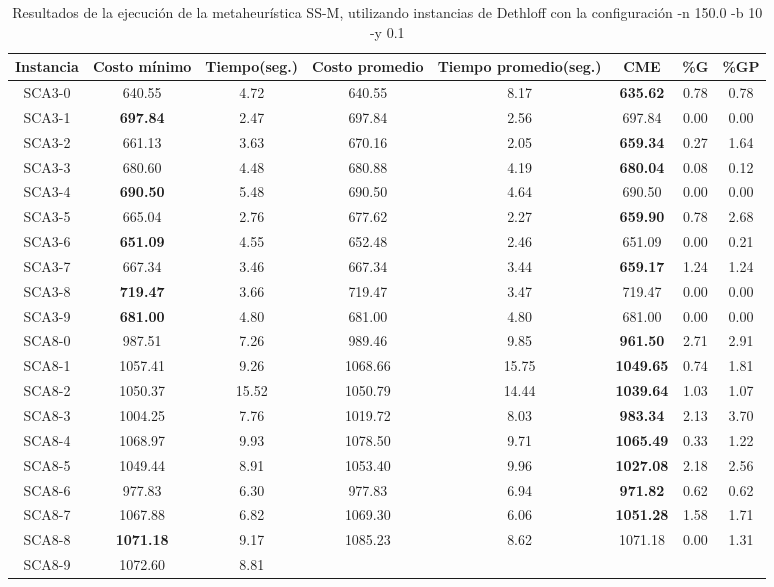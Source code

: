 \begin{table}[h]
\caption{Resultados de la ejecución de la metaheurística SS-M, utilizando instancias de Dethloff con la configuración -n 150.0 -b 10 -y 0.1}
\centering
\small
\begin{tabular}{c c c c c c c c}
\hline\hline
Instancia & Costo mínimo & Tiempo(seg.) & Costo promedio & Tiempo promedio(seg.) & CME & \%G & \%GP \\ [0.5ex]
\hline
SCA3-0 & 640.55 & 4.72 & 
640.55 & 8.17 & \bf{635.62} & 
0.78 & 0.78\\SCA3-1 & \bf{697.84} & 2.47 & 
697.84 & 2.56 & 697.84 & 0.00
 & 0.00\\
SCA3-2 & 661.13 & 3.63 & 
670.16 & 2.05 & \bf{659.34} & 
0.27 & 1.64\\SCA3-3 & 680.60 & 4.48 & 
680.88 & 4.19 & \bf{680.04} & 
0.08 & 0.12\\SCA3-4 & \bf{690.50} & 5.48 & 
690.50 & 4.64 & 690.50 & 0.00
 & 0.00\\
SCA3-5 & 665.04 & 2.76 & 
677.62 & 2.27 & \bf{659.90} & 
0.78 & 2.68\\SCA3-6 & \bf{651.09} & 4.55 & 
652.48 & 2.46 & 651.09 & 0.00
 & 0.21\\SCA3-7 & 667.34 & 3.46 & 
667.34 & 3.44 & \bf{659.17} & 
1.24 & 1.24\\SCA3-8 & \bf{719.47} & 3.66 & 
719.47 & 3.47 & 719.47 & 0.00
 & 0.00\\
SCA3-9 & \bf{681.00} & 4.80 & 
681.00 & 4.80 & 681.00 & 0.00
 & 0.00\\
SCA8-0 & 987.51 & 7.26 & 
989.46 & 9.85 & \bf{961.50} & 
2.71 & 2.91\\SCA8-1 & 1057.41 & 9.26 & 
1068.66 & 15.75 & \bf{1049.65} & 
0.74 & 1.81\\SCA8-2 & 1050.37 & 15.52 & 
1050.79 & 14.44 & \bf{1039.64} & 
1.03 & 1.07\\SCA8-3 & 1004.25 & 7.76 & 
1019.72 & 8.03 & \bf{983.34} & 
2.13 & 3.70\\SCA8-4 & 1068.97 & 9.93 & 
1078.50 & 9.71 & \bf{1065.49} & 
0.33 & 1.22\\SCA8-5 & 1049.44 & 8.91 & 
1053.40 & 9.96 & \bf{1027.08} & 
2.18 & 2.56\\SCA8-6 & 977.83 & 6.30 & 
977.83 & 6.94 & \bf{971.82} & 
0.62 & 0.62\\SCA8-7 & 1067.88 & 6.82 & 
1069.30 & 6.06 & \bf{1051.28} & 
1.58 & 1.71\\SCA8-8 & \bf{1071.18} & 9.17 & 
1085.23 & 8.62 & 1071.18 & 0.00
 & 1.31\\SCA8-9 & 1072.60 & 8.81 & 

\end{tabular}
\end{table}
